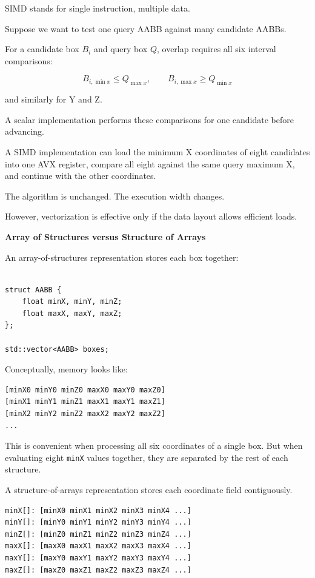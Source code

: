 SIMD stands for single instruction, multiple data.

Suppose we want to test one query AABB against many candidate AABBs.

For a candidate box \(B_i\) and query box \(Q\), overlap requires all six interval comparisons:

\[
B_{i,\min x}\le Q_{\max x}, \qquad B_{i,\max x}\ge Q_{\min x}
\]

and similarly for Y and Z.

A scalar implementation performs these comparisons for one candidate before advancing.

A SIMD implementation can load the minimum X coordinates of eight candidates into one AVX register, compare all eight against the same query maximum X, and continue with the other coordinates.

The algorithm is unchanged. The execution width changes.

However, vectorization is effective only if the data layout allows efficient loads.

\textbf{Array of Structures versus Structure of Arrays}

An array-of-structures representation stores each box together:

\begin{verbatim}

struct AABB {
    float minX, minY, minZ;
    float maxX, maxY, maxZ;
};

std::vector<AABB> boxes;
\end{verbatim}

Conceptually, memory looks like:

\begin{verbatim}
[minX0 minY0 minZ0 maxX0 maxY0 maxZ0]
[minX1 minY1 minZ1 maxX1 maxY1 maxZ1]
[minX2 minY2 minZ2 maxX2 maxY2 maxZ2]
...
\end{verbatim}

This is convenient when processing all six coordinates of a single box. But when evaluating eight \texttt{minX} values together, they are separated by the rest of each structure.

A structure-of-arrays representation stores each coordinate field contiguously.

\begin{verbatim}
minX[]: [minX0 minX1 minX2 minX3 minX4 ...]
minY[]: [minY0 minY1 minY2 minY3 minY4 ...]
minZ[]: [minZ0 minZ1 minZ2 minZ3 minZ4 ...]
maxX[]: [maxX0 maxX1 maxX2 maxX3 maxX4 ...]
maxY[]: [maxY0 maxY1 maxY2 maxY3 maxY4 ...]
maxZ[]: [maxZ0 maxZ1 maxZ2 maxZ3 maxZ4 ...]
\end{verbatim}


